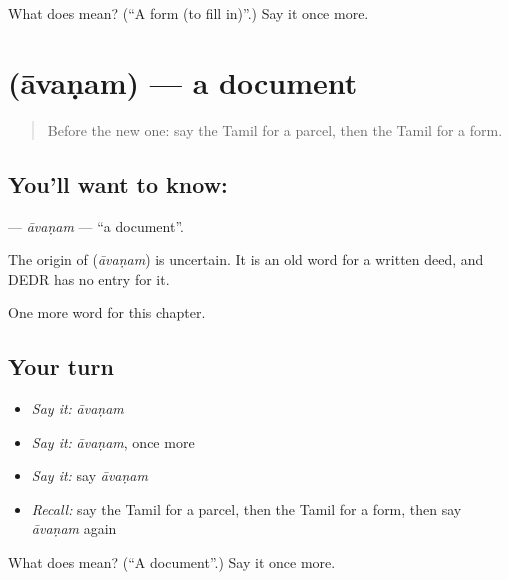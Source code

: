 \begin{tcolorbox}[breakable,colback=teal!4,colframe=teal!35!black,title={Before you move on}]
What does  mean? (\textquotedblleft{}A form (to fill in)\textquotedblright{}.) Say it once more.
\end{tcolorbox}
\section[\texorpdfstring{\ta{ஆவணம்} (āvaṇam)}{ஆவணம் (āvaṇam)}]{ (āvaṇam) — a document}

\label{lesson:TA-C244-avanam}



\begin{quote}
Before the new one: say the Tamil for a parcel, then the Tamil for a form.
\end{quote}

\subsection*{You'll want to know: }
\textbf{} — \emph{āvaṇam} — \textquotedblleft{}a document\textquotedblright{}.

\begin{cousinweb}
The origin of \textbf{} (\emph{āvaṇam}) is uncertain. It is an old word for a written deed, and DEDR has no entry for it.
\end{cousinweb}

\begin{grammarlens}[title={What you've built}]
One more word for this chapter.
\end{grammarlens}

\subsection*{Your turn}
\begin{itemize}
\raggedright
  \item \emph{Say it:} \emph{āvaṇam}
  \item \emph{Say it:} \emph{āvaṇam}, once more
  \item \emph{Say it:} say \emph{āvaṇam}
  \item \emph{Recall:} say the Tamil for a parcel, then the Tamil for a form, then say \emph{āvaṇam} again
\end{itemize}

\begin{tcolorbox}[breakable,colback=teal!4,colframe=teal!35!black,title={Before you move on}]
What does  mean? (\textquotedblleft{}A document\textquotedblright{}.) Say it once more.
\end{tcolorbox}
